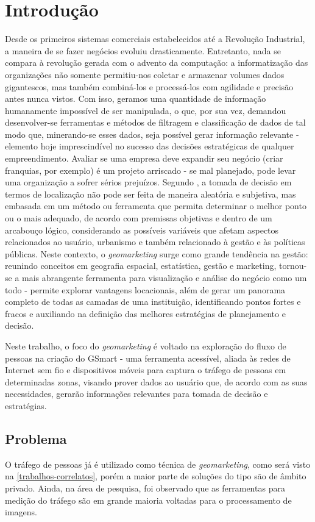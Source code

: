 
\chapter{Introdução}
\label{introducao}

Desde os primeiros sistemas comerciais estabelecidos até a Revolução Industrial,
a maneira de se fazer negócios evoluiu drasticamente. Entretanto, nada se
compara à revolução gerada com o advento da computação: a informatização das
organizações não somente permitiu-nos coletar e armazenar volumes dados
gigantescos, mas também combiná-los e processá-los com agilidade e precisão antes nunca
vistos. Com isso, geramos uma quantidade de informação humanamente impossível de
ser manipulada, o que, por sua vez, demandou desenvolver-se ferramentas e
métodos de filtragem e classificação de dados de tal modo que, minerando-se esses dados, seja possível gerar
informação relevante - elemento hoje imprescindível no sucesso
das decisões estratégicas de qualquer empreendimento. Avaliar se uma empresa
deve expandir seu negócio (criar franquias, por exemplo) é um projeto
arriscado - se mal planejado, pode levar uma organização a sofrer sérios
prejuízos. Segundo , a tomada de decisão em termos de
localização não pode ser feita de maneira aleatória e subjetiva, mas embasada em
um método ou ferramenta que permita determinar o melhor ponto ou o mais
adequado, de acordo com premissas objetivas e dentro de um arcabouço lógico,
considerando as possíveis variáveis que afetam aspectos relacionados ao usuário,
urbanismo e também relacionado à gestão e às políticas públicas. Neste contexto, o \emph{geomarketing} surge como grande tendência na gestão: reunindo conceitos em geografia espacial, estatística, gestão e marketing, tornou-se a mais abrangente ferramenta para visualização e análise do negócio como um todo - permite explorar vantagens locacionais, além de gerar um panorama completo de todas as camadas de uma instituição, identificando pontos fortes e fracos e auxiliando na definição das melhores estratégias de planejamento e decisão.

Neste trabalho, o foco do \emph{geomarketing} é voltado na exploração do fluxo
de pessoas na criação do GSmart - uma ferramenta acessível, aliada às redes de
Internet sem fio e dispositivos móveis para captura o tráfego de pessoas em
determinadas zonas, visando prover dados ao usuário que, de acordo com as suas
necessidades, gerarão informações relevantes para tomada de decisão e estratégias.

\section{Problema}
O tráfego de pessoas já é utilizado como técnica de \emph{geomarketing}, como será visto na \autoref{trabalhos-correlatos}, porém
a maior parte de soluções do tipo são de âmbito privado. Ainda, na área de pesquisa, foi observado que as ferramentas para medição do tráfego
são em grande maioria voltadas para o processamento de imagens.

